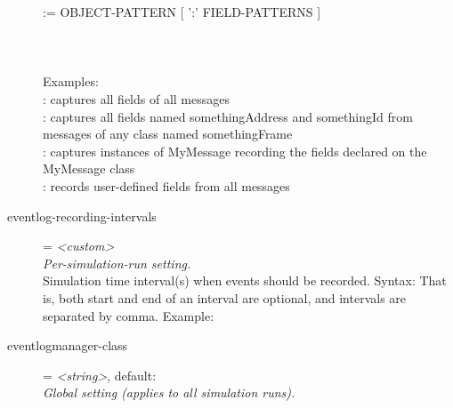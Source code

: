 \begin{description}
{    {\allowbreak}:{\allowbreak}={\allowbreak}
    {\allowbreak}OBJECT-{\allowbreak}PATTERN {\allowbreak}[
    {\allowbreak}':{\allowbreak}' {\allowbreak}FIELD-{\allowbreak}PATTERNS
    {\allowbreak}]}\\  \\ 
    \\  \\Examples:\\  \ttt{*}: captures
    all fields of all messages\\ 
    : captures all fields
    named somethingAddress and somethingId from messages of any class named
    somethingFrame\\  :
    captures instances of MyMessage recording the fields declared on the
    MyMessage class\\  : records user-defined fields from all
    messages
\item[eventlog-recording-intervals] = \textit{<custom>}\\
    \textit{Per-simulation-run setting.}\\
    Simulation time interval(s) when events should be recorded. Syntax:
     That is,
    both start and end of an interval are optional, and intervals are separated
    by comma. Example: 
\item[eventlogmanager-class] = \textit{<string>}, default: \\
    \textit{Global setting (applies to all simulation runs).}\\

\end{description}
